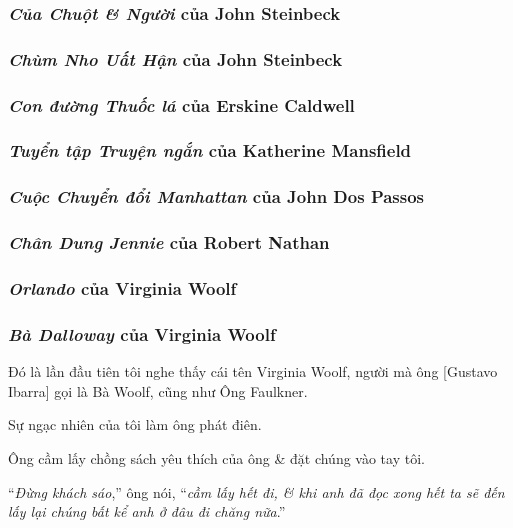 \documentclass{article}
\begin{document}
\subsubsection{\textit{Của Chuột \& Người} của John Steinbeck}

\subsubsection{\textit{Chùm Nho Uất Hận} của John Steinbeck}

\subsubsection{\textit{Con đường Thuốc lá} của Erskine Caldwell}

\subsubsection{\textit{Tuyển tập Truyện ngắn} của Katherine Mansfield}

\subsubsection{\textit{Cuộc Chuyển đổi Manhattan} của John Dos Passos}

\subsubsection{\textit{Chân Dung Jennie} của Robert Nathan}

\subsubsection{\textit{Orlando} của Virginia Woolf}

\subsubsection{\textit{Bà Dalloway} của Virginia Woolf}
Đó là lần đầu tiên tôi nghe thấy cái tên Virginia Woolf, người mà ông [Gustavo Ibarra] gọi là Bà Woolf, cũng như Ông Faulkner.

Sự ngạc nhiên của tôi làm ông phát điên.

Ông cầm lấy chồng sách yêu thích của ông \& đặt chúng vào tay tôi.

%
``\textit{Đừng khách sáo},'' ông nói, ``\textit{cầm lấy hết đi, \& khi anh đã đọc xong hết ta sẽ đến lấy lại chúng bất kể anh ở đâu đi chăng nữa}.''
\end{document}
